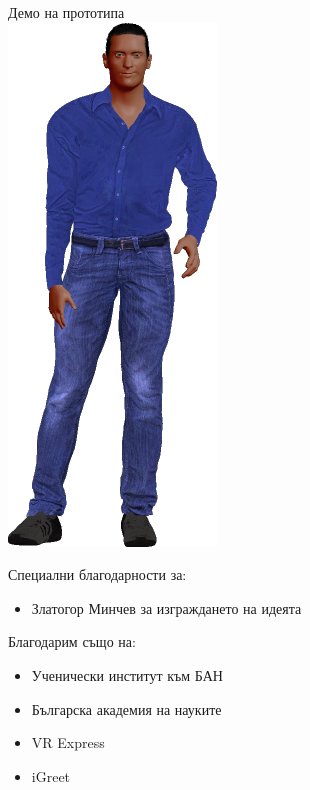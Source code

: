 \documentclass[12pt]{beamer}
\begin{document}
	\begin{frame}
		\begin{center}
			{\Huge Демо на прототипа} \\ \vspace{1cm}
			\includegraphics[scale=0.25]{../bad_boy.png}
		\end{center}
	\end{frame}
	\begin{frame}
		 	 	 Специални благодарности за:
		\begin{itemize}
			\item Златогор Минчев за изграждането на идеята
		\end{itemize}
		Благодарим също на:
		\begin{itemize}
			\item Ученически институт към БАН
			\item Българска академия на науките
			\item VR Express
			\item iGreet
		\end{itemize}
	\end{frame}
	
\end{document}
